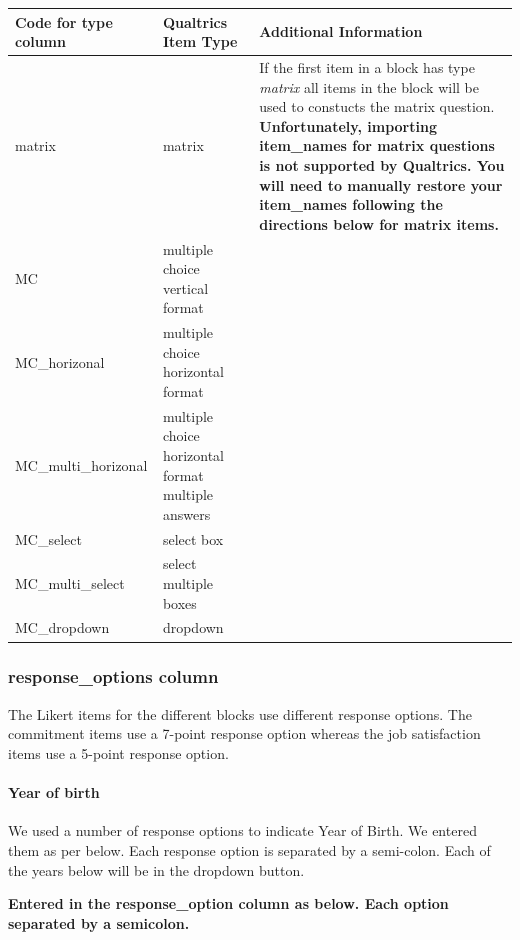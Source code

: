 \documentclass[
]{krantz}
\begin{document}
\begin{longtable}[]{@{}
  >{\raggedright\arraybackslash}p{}
  >{\raggedright\arraybackslash}p{}
  >{\raggedright\arraybackslash}p{}@{}}
\toprule
Code for type column & Qualtrics Item Type & Additional Information \\
\midrule
\endhead
matrix & matrix & If the first item in a block has type \emph{matrix} all items in the block will be used to constucts the matrix question. \textbf{Unfortunately, importing item\_names for matrix questions is not supported by Qualtrics. You will need to manually restore your item\_names following the directions below for matrix items.} \\
MC & multiple choice vertical format & \\
MC\_horizonal & multiple choice horizontal format & \\
MC\_multi\_horizonal & multiple choice horizontal format multiple answers & \\
MC\_select & select box & \\
MC\_multi\_select & select multiple boxes & \\
MC\_dropdown & dropdown & \\
\bottomrule
\end{longtable}

\hypertarget{response_options-column}{%
\subsubsection{response\_options column}\label{response_options-column}}

The Likert items for the different blocks use different response options. The commitment items use a 7-point response option whereas the job satisfaction items use a 5-point response option.

\hypertarget{year-of-birth}{%
\paragraph{Year of birth}\label{year-of-birth}}

We used a number of response options to indicate Year of Birth. We entered them as per below. Each response option is separated by a semi-colon. Each of the years below will be in the dropdown button.

\textbf{Entered in the response\_option column as below. Each option separated by a semicolon.}
\end{document}

